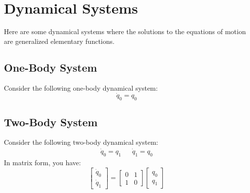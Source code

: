 \chapter{Dynamical Systems}
Here are some dynamical systems where the solutions to the equations of motion are generalized elementary functions.
\section{One-Body System}
Consider the following one-body dynamical system:
\begin{equation}
    \dot{q}_{0} = q_{0}
\end{equation}
\section{Two-Body System}
Consider the following two-body dynamical system:
\begin{align}
    \dot{q}_{0} = q_{1} && \dot{q}_{1} = q_{0}
\end{align}
In matrix form, you have:
\begin{equation}
    \begin{bmatrix}
        \dot{q}_{0} \\ \dot{q}_{1}
    \end{bmatrix} = \begin{bmatrix}
        0 & 1 \\
        1 & 0
    \end{bmatrix} \begin{bmatrix}
        q_{0} \\ q_{1}
    \end{bmatrix}
\end{equation}
